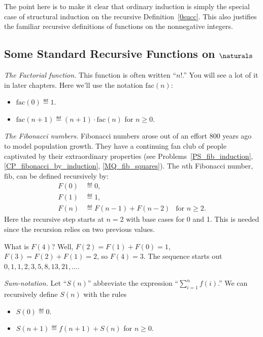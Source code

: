 The point here is to make it clear that ordinary induction is simply the
special case of structural induction on the recursive
Definition~\ref{0succ}.  This also justifies the familiar recursive
definitions of functions on the nonnegative integers.

\subsection{Some Standard Recursive Functions on $\naturals$}

\begin{example}\label{factorial-def}

\emph{The Factorial function.}  This function is often written
``$n!$.''  You will see a lot of it in later chapters.  Here we'll use
the notation $\text{fac}(n)$:
\begin{itemize}
\item $\text{fac}(0) \eqdef 1$.
\item $\text{fac}(n+1) \eqdef (n+1)\cdot \text{fac}(n)$ for $n \ge 0$.
\end{itemize}

\end{example}
\begin{example}\label{fib-def}
\emph{The Fibonacci numbers.}  Fibonacci numbers arose out of an
effort 800 years ago to model population growth.  They have a
continuing fan club of people captivated by their extraordinary
properties (see Problems~\ref{PS_fib_induction},
\ref{CP_fibonacci_by_induction}, \ref{MQ_fib_squares}).  The $n$th
Fibonacci number, $\text{fib}$, can be defined recursively by:
\begin{align*}
F(0) &\eqdef 0,\\
F(1) &\eqdef 1,\\ 
F(n) &\eqdef F(n-1) + F(n-2) &\mbox{for $n \geq 2$.} 
\end{align*}
Here the recursive step starts at $n=2$ with base cases for 0 and 1.  This
is needed since the recursion relies on two previous values.

What is $F(4)$?  Well, $F(2) = F(1)+F(0) = 1$, $F(3) =
F(2)+F(1) = 2$, so $F(4) = 3$.  The sequence
starts out $0, 1, 1, 2, 3, 5, 8, 13, 21,\dots$.

\end{example}

\begin{example}

\emph{Sum-notation.}\label{sum-notation-def} Let ``$S(n)$'' abbreviate
the expression ``$\sum_{i=1}^n f(i)$.''  We can recursively define
$S(n)$ with the rules
  \begin{itemize}
  \item $S(0) \eqdef 0$.
  \item $S(n+1) \eqdef  f(n+1) + S(n)$ for $n\geq 0$.
  \end{itemize}
\end{example}

